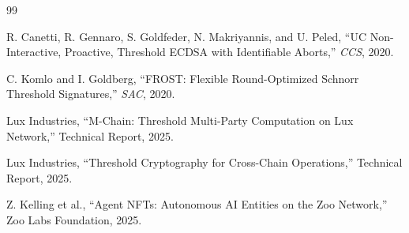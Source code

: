 \documentclass[11pt,letterpaper]{article}
\begin{document}

\begin{thebibliography}{99}

R. Canetti, R. Gennaro, S. Goldfeder, N. Makriyannis, and U. Peled, ``UC Non-Interactive, Proactive, Threshold ECDSA with Identifiable Aborts,'' \textit{CCS}, 2020.

C. Komlo and I. Goldberg, ``FROST: Flexible Round-Optimized Schnorr Threshold Signatures,'' \textit{SAC}, 2020.

Lux Industries, ``M-Chain: Threshold Multi-Party Computation on Lux Network,'' Technical Report, 2025.

Lux Industries, ``Threshold Cryptography for Cross-Chain Operations,'' Technical Report, 2025.

Z. Kelling et al., ``Agent NFTs: Autonomous AI Entities on the Zoo Network,'' Zoo Labs Foundation, 2025.

\end{thebibliography}
\end{document}
